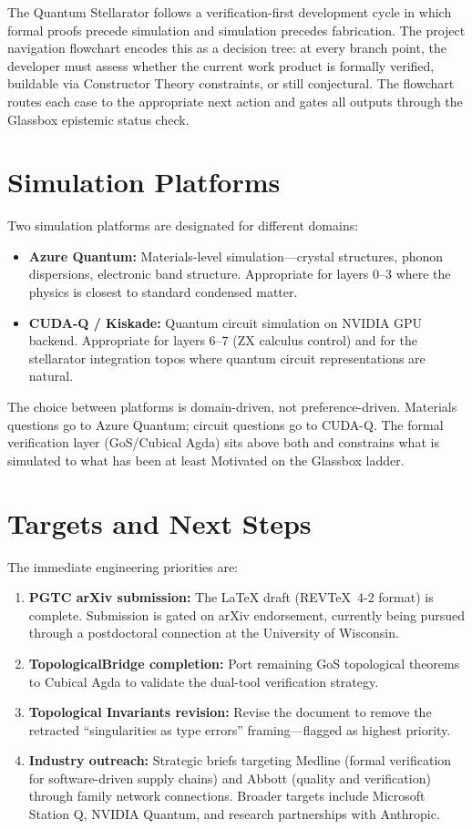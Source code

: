 \documentclass[12pt,letterpaper]{report}
\begin{document}
The Quantum Stellarator follows a verification-first development cycle in which formal proofs precede simulation and simulation precedes fabrication. The project navigation flowchart encodes this as a decision tree: at every branch point, the developer must assess whether the current work product is formally verified, buildable via Constructor Theory constraints, or still conjectural. The flowchart routes each case to the appropriate next action and gates all outputs through the Glassbox epistemic status check.

\section{Simulation Platforms}

Two simulation platforms are designated for different domains:

\begin{itemize}
  \item \textbf{Azure Quantum:} Materials-level simulation---crystal structures, phonon dispersions, electronic band structure. Appropriate for layers 0--3 where the physics is closest to standard condensed matter.
  \item \textbf{CUDA-Q / Kiskade:} Quantum circuit simulation on NVIDIA GPU backend. Appropriate for layers 6--7 (ZX calculus control) and for the stellarator integration topos where quantum circuit representations are natural.
\end{itemize}

The choice between platforms is domain-driven, not preference-driven. Materials questions go to Azure Quantum; circuit questions go to CUDA-Q. The formal verification layer (GoS/Cubical Agda) sits above both and constrains what is simulated to what has been at least Motivated on the Glassbox ladder.

\section{Targets and Next Steps}

The immediate engineering priorities are:

\begin{enumerate}
  \item \textbf{PGTC arXiv submission:} The \LaTeX{} draft (REVTeX~4-2 format) is complete. Submission is gated on arXiv endorsement, currently being pursued through a postdoctoral connection at the University of Wisconsin.
  \item \textbf{TopologicalBridge completion:} Port remaining GoS topological theorems to Cubical Agda to validate the dual-tool verification strategy.
  \item \textbf{Topological Invariants revision:} Revise the document to remove the retracted ``singularities as type errors'' framing---flagged as highest priority.
  \item \textbf{Industry outreach:} Strategic briefs targeting Medline (formal verification for software-driven supply chains) and Abbott (quality and verification) through family network connections. Broader targets include Microsoft Station Q, NVIDIA Quantum, and research partnerships with Anthropic.
\end{enumerate}
\end{document}
